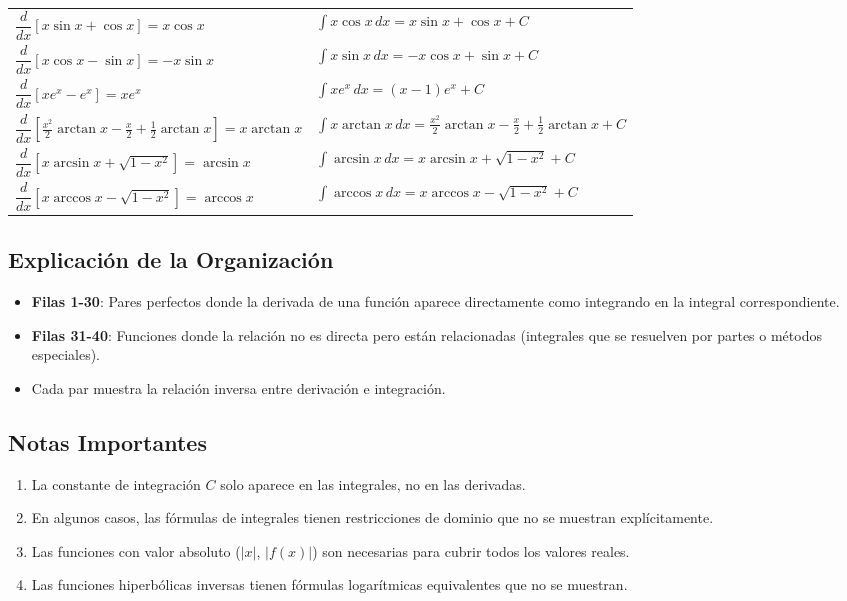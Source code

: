\documentclass{article}
\begin{document}
\begin{center}
\begin{tabular}{p{}p{}}
$\dfrac{d}{dx}[x\sin x + \cos x] = x\cos x$ & $\displaystyle\int x\cos x \, dx = x\sin x + \cos x + C$ \\
$\dfrac{d}{dx}[x\cos x - \sin x] = -x\sin x$ & $\displaystyle\int x\sin x \, dx = -x\cos x + \sin x + C$ \\
$\dfrac{d}{dx}[xe^x - e^x] = xe^x$ & $\displaystyle\int xe^x \, dx = (x-1)e^x + C$ \\
$\dfrac{d}{dx}\!\left[\frac{x^2}{2}\arctan x - \frac{x}{2} + \frac{1}{2}\arctan x\right] = x\arctan x$ & $\displaystyle\int x\arctan x \, dx = \frac{x^2}{2}\arctan x - \frac{x}{2} + \frac{1}{2}\arctan x + C$ \\
$\dfrac{d}{dx}[x\arcsin x + \sqrt{1-x^2}] = \arcsin x$ & $\displaystyle\int \arcsin x \, dx = x\arcsin x + \sqrt{1-x^2} + C$ \\
$\dfrac{d}{dx}[x\arccos x - \sqrt{1-x^2}] = \arccos x$ & $\displaystyle\int \arccos x \, dx = x\arccos x - \sqrt{1-x^2} + C$ \\
\bottomrule
\end{tabular}
\end{center}

\subsection*{Explicación de la Organización}
\begin{itemize}
\item \textbf{Filas 1-30}: Pares perfectos donde la derivada de una función aparece directamente como integrando en la integral correspondiente.
\item \textbf{Filas 31-40}: Funciones donde la relación no es directa pero están relacionadas (integrales que se resuelven por partes o métodos especiales).
\item Cada par muestra la relación inversa entre derivación e integración.
\end{itemize}

\subsection*{Notas Importantes}
\begin{enumerate}
\item La constante de integración $C$ solo aparece en las integrales, no en las derivadas.
\item En algunos casos, las fórmulas de integrales tienen restricciones de dominio que no se muestran explícitamente.
\item Las funciones con valor absoluto ($|x|$, $|f(x)|$) son necesarias para cubrir todos los valores reales.
\item Las funciones hiperbólicas inversas tienen fórmulas logarítmicas equivalentes que no se muestran.
\end{enumerate}
\end{document}
